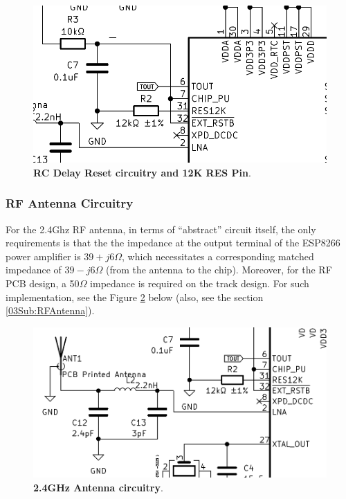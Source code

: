 \begin{figure}[H]
    \centering
    \includegraphics[scale = 0.5]{imagens/RCDelayResetCircuitry.png}
    \caption{\textbf{RC Delay Reset circuitry and 12K RES Pin}.}
    \label{02fig:RCDelayResetCircuitry}
\end{figure}


\subsubsection{RF Antenna Circuitry}\label{02SubSub:RFAntennaCircuitry}

For the 2.4Ghz RF antenna, in terms of ``abstract'' circuit itself, the only requirements is that the
the impedance at the output terminal of the ESP8266 power amplifier is $39 + j6 \Omega$, which necessitates a corresponding 
matched impedance of $39-j6 \Omega$ (from the antenna to the chip). Moreover, for the RF PCB design, a 50$\Omega$ impedance is required
on the track design. For such implementation,
see the Figure \ref{02fig:RFAntennaCircuitry} below (also, see the section \ref{03Sub:RFAntenna}).




\begin{figure}[H]
    \centering
    \includegraphics[scale = 0.5]{imagens/RFAntennaCircuitry.png}
    \caption{\textbf{2.4GHz Antenna circuitry}.}
    \label{02fig:RFAntennaCircuitry}
\end{figure}


